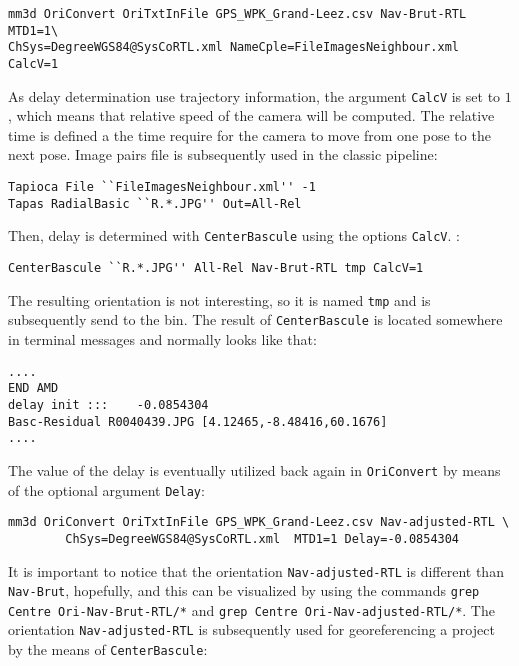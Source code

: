 \begin{verbatim}
mm3d OriConvert OriTxtInFile GPS_WPK_Grand-Leez.csv Nav-Brut-RTL MTD1=1\
ChSys=DegreeWGS84@SysCoRTL.xml NameCple=FileImagesNeighbour.xml CalcV=1
\end{verbatim}

As delay determination use trajectory information, the argument {\tt CalcV} is set to $1$, which means that relative speed of the camera will be computed. The relative time is defined a the time require for the camera to move from one pose to the next pose.
Image pairs file is subsequently used in the classic pipeline:

\begin{verbatim}
Tapioca File ``FileImagesNeighbour.xml'' -1
Tapas RadialBasic ``R.*.JPG'' Out=All-Rel
\end{verbatim}

Then, delay is determined with {\tt CenterBascule} using the options {\tt CalcV}.  :

\begin{verbatim}
CenterBascule ``R.*.JPG'' All-Rel Nav-Brut-RTL tmp CalcV=1
\end{verbatim}

The resulting orientation is not interesting, so it is named {\tt tmp} and is subsequently send to the bin. The result of {\tt CenterBascule} is located somewhere in terminal messages and normally looks like that:

\begin{verbatim}
....
END AMD
delay init :::    -0.0854304
Basc-Residual R0040439.JPG [4.12465,-8.48416,60.1676]
....
\end{verbatim}

The value of the delay is eventually utilized back again in {\tt OriConvert} by means of the optional argument {\tt Delay}:

\begin{verbatim}
mm3d OriConvert OriTxtInFile GPS_WPK_Grand-Leez.csv Nav-adjusted-RTL \
        ChSys=DegreeWGS84@SysCoRTL.xml 	MTD1=1 Delay=-0.0854304
\end{verbatim}

It is important to notice that the orientation {\tt  Nav-adjusted-RTL} is different than {\tt Nav-Brut}, hopefully, and this can be visualized by using the commands {\tt grep Centre Ori-Nav-Brut-RTL/*} and {\tt grep Centre Ori-Nav-adjusted-RTL/*}. The orientation {\tt  Nav-adjusted-RTL} is subsequently used for georeferencing a project by the means of {\tt CenterBascule}:

